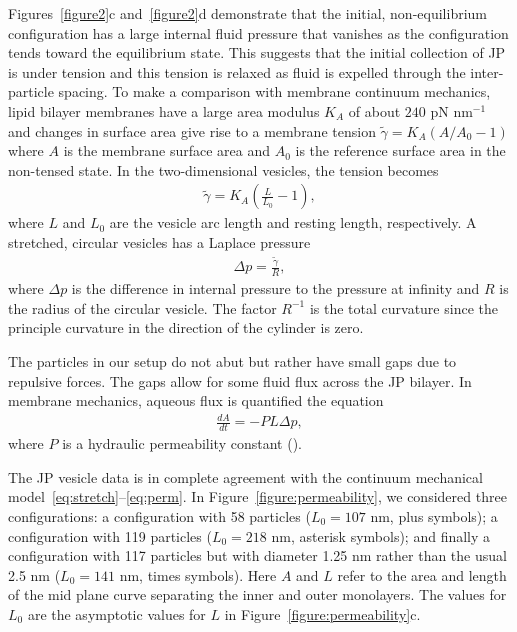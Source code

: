 \documentclass[lineno]{jfm}
\begin{document}
Figures~\ref{figure2}c and~\ref{figure2}d demonstrate that the initial, non-equilibrium configuration has a large internal fluid pressure
that vanishes as the configuration tends toward the equilibrium state.  
This suggests that the initial collection of JP is under tension and
this tension is relaxed as fluid is expelled through the inter-particle
spacing. To make a comparison with membrane continuum mechanics, lipid
bilayer membranes have a large area modulus $K_A$ of about $240$ pN
nm$^{-1}$ \cite{NAGLE} and changes in surface area give rise to a
membrane tension $\tilde \gamma = K_A(A/A_0 - 1)$ where $A$ is the
membrane surface area and $A_0$ is the reference surface area in the
non-tensed state. In the two-dimensional vesicles, the tension becomes
\begin{align}
\label{eq:stretch}
\tilde \gamma = K_A\left(\frac{L}{L_0} - 1 \right),
\end{align}
where $L$ and $L_0$ are the vesicle arc length and resting length,
respectively. A stretched, circular vesicles has a Laplace pressure 
\begin{align}
\label{eq:LaplacePressure}
\Delta p = \frac{\tilde \gamma}{R},
\end{align}
where $\Delta p$ is the difference in internal pressure to the pressure
at infinity and $R$ is the radius of the circular vesicle. The factor
$R^{-1}$ is the total curvature since the principle curvature in the
direction of the cylinder is zero.



The particles in our setup do not abut but rather have small gaps due to
repulsive forces. The gaps allow for some fluid flux across the JP
bilayer. In membrane mechanics, aqueous flux is quantified the equation
\begin{align}
  \label{eq:perm} 
  \frac{dA}{dt} = -P  L \Delta p,
\end{align}
where $P$ is a hydraulic permeability constant (\cite{chabanon2017,
qua-gan-you2021}).

The JP vesicle data is in complete agreement with the continuum
mechanical model~\eqref{eq:stretch}--\eqref{eq:perm}. In
Figure~\ref{figure:permeability}, we considered three configurations: a
configuration with 58 particles ($L_0 = 107$ nm, plus symbols); a
configuration with 119 particles ($L_0 = 218$ nm, asterisk symbols); and
finally a configuration with 117 particles but with diameter 1.25 nm
rather than the usual 2.5 nm ($L_0 = 141$ nm, times symbols). Here $A$
and $L$ refer to the area and length of the mid plane curve separating
the inner and outer monolayers. The values for $L_0$ are the asymptotic
values for $L$ in Figure~\ref{figure:permeability}c.
\end{document}
